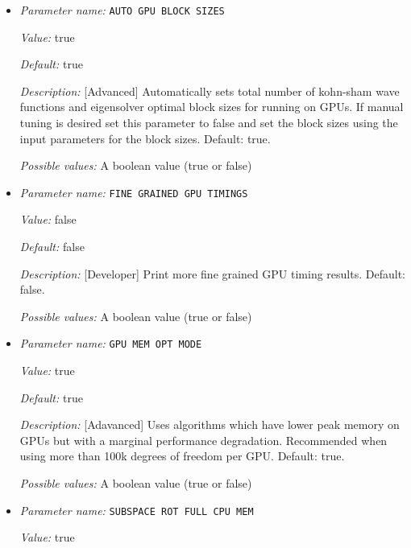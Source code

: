 \begin{itemize}
\item {\it Parameter name:} {\tt AUTO GPU BLOCK SIZES}
\label{parameters:GPU/AUTO GPU BLOCK SIZES}
\label{parameters:GPU/AUTO_20GPU_20BLOCK_20SIZES}


{\it Value:} true


{\it Default:} true


{\it Description:} [Advanced] Automatically sets total number of kohn-sham wave functions and eigensolver optimal block sizes for running on GPUs. If manual tuning is desired set this parameter to false and set the block sizes using the input parameters for the block sizes. Default: true.


{\it Possible values:} A boolean value (true or false)
\item {\it Parameter name:} {\tt FINE GRAINED GPU TIMINGS}
\label{parameters:GPU/FINE GRAINED GPU TIMINGS}
\label{parameters:GPU/FINE_20GRAINED_20GPU_20TIMINGS}


{\it Value:} false


{\it Default:} false


{\it Description:} [Developer] Print more fine grained GPU timing results. Default: false.


{\it Possible values:} A boolean value (true or false)
\item {\it Parameter name:} {\tt GPU MEM OPT MODE}
\label{parameters:GPU/GPU MEM OPT MODE}
\label{parameters:GPU/GPU_20MEM_20OPT_20MODE}


{\it Value:} true


{\it Default:} true


{\it Description:} [Adavanced] Uses algorithms which have lower peak memory on GPUs but with a marginal performance degradation. Recommended when using more than 100k degrees of freedom per GPU. Default: true.


{\it Possible values:} A boolean value (true or false)
\item {\it Parameter name:} {\tt SUBSPACE ROT FULL CPU MEM}
\label{parameters:GPU/SUBSPACE ROT FULL CPU MEM}
\label{parameters:GPU/SUBSPACE_20ROT_20FULL_20CPU_20MEM}


{\it Value:} true



\end{itemize}
